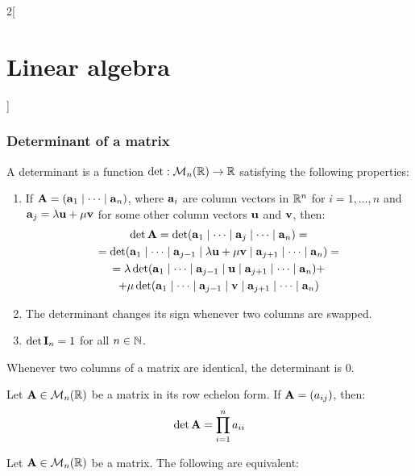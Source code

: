 \documentclass[../../../main.tex]{subfiles}
\begin{document}
\begin{multicols}{2}[\section{Linear algebra}]
  \subsubsection{Determinant of a matrix}
  \begin{definition}[Determinant]
    A determinant is a function $\det:\mathcal{M}_n(\mathbb{R})\rightarrow\mathbb{R}$ satisfying the following properties:
    \begin{enumerate}
      \item If $\boldsymbol{\mathrm{A}}=(\boldsymbol{\mathrm{a}}_1\mid\cdots\mid \boldsymbol{\mathrm{a}}_n)$, where $\boldsymbol{\mathrm{a}}_i$ are column vectors in $\mathbb{R}^n$ for $i=1,\ldots,n$ and $\boldsymbol{\mathrm{a}}_j=\lambda\boldsymbol{\mathrm{u}}+\mu\boldsymbol{\mathrm{v}}$ for some other column vectors $\boldsymbol{\mathrm{u}}$ and $\boldsymbol{\mathrm{v}}$, then:
            \begin{multline*}
              \det \boldsymbol{\mathrm{A}}=\det(\boldsymbol{\mathrm{a}}_1\mid\cdots\mid\boldsymbol{\mathrm{a}}_j\mid\cdots\mid \boldsymbol{\mathrm{a}}_n)=\\=\det(\boldsymbol{\mathrm{a}}_1\mid\cdots\mid \boldsymbol{\mathrm{a}}_{j-1}\mid\lambda \boldsymbol{\mathrm{u}}+\mu \boldsymbol{\mathrm{v}}\mid \boldsymbol{\mathrm{a}}_{j+1}\mid\cdots\mid \boldsymbol{\mathrm{a}}_n)=\\=\lambda\det(\boldsymbol{\mathrm{a}}_1\mid\cdots\mid \boldsymbol{\mathrm{a}}_{j-1}\mid \boldsymbol{\mathrm{u}}\mid \boldsymbol{\mathrm{a}}_{j+1}\mid\cdots\mid \boldsymbol{\mathrm{a}}_n)+\\+\mu\det(\boldsymbol{\mathrm{a}}_1\mid\cdots\mid \boldsymbol{\mathrm{a}}_{j-1}\mid \boldsymbol{\mathrm{v}}\mid \boldsymbol{\mathrm{a}}_{j+1}\mid\cdots\mid \boldsymbol{\mathrm{a}}_n)
            \end{multline*}
      \item The determinant changes its sign whenever two columns are swapped.
      \item $\det \boldsymbol{\mathrm{I}}_n=1$ for all $n\in\mathbb{N}$.
    \end{enumerate}
  \end{definition}
  \begin{lemma}
    Whenever two columns of a matrix are identical, the determinant is 0.
  \end{lemma}
  \begin{prop}
    Let $\boldsymbol{\mathrm{A}}\in\mathcal{M}_n(\mathbb{R})$ be a matrix in its row echelon form. If $\boldsymbol{\mathrm{A}}=(a_{ij})$, then: $$\det\boldsymbol{\mathrm{A}}=\prod_{i=1}^na_{ii}$$
  \end{prop}
  \begin{prop}
    Let $\boldsymbol{\mathrm{A}}\in\mathcal{M}_n(\mathbb{R})$ be a matrix. The following are equivalent:

\end{prop}
\end{multicols}
\end{document}
